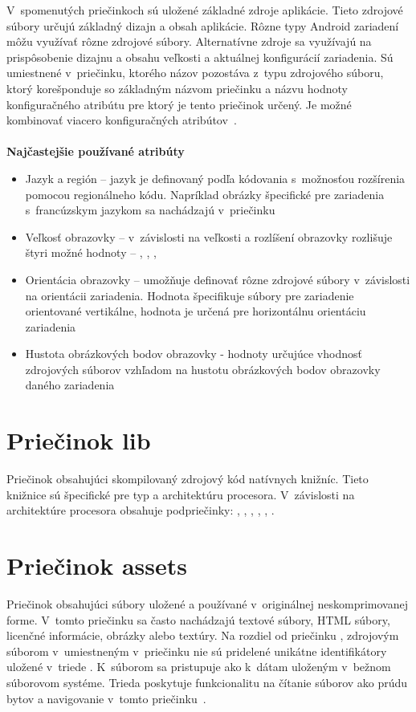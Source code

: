 \noindent V~spomenutých priečinkoch sú uložené základné zdroje aplikácie. Tieto zdrojové súbory určujú základný dizajn a obsah aplikácie. Rôzne typy Android zariadení môžu využívať rôzne zdrojové súbory. Alternatívne zdroje sa využívajú na prispôsobenie dizajnu a obsahu veľkosti a aktuálnej konfigurácií zariadenia. Sú umiestnené v~priečinku, ktorého názov pozostáva z~typu zdrojového súboru, ktorý korešponduje so základným názvom priečinku a názvu hodnoty konfiguračného atribútu pre ktorý je tento priečinok určený. Je možné kombinovať viacero konfiguračných atribútov~\cite{providingAltRes}.\\\\
\textbf{Najčastejšie používané atribúty}
\begin{itemize}
\item Jazyk a región – jazyk je definovaný podľa kódovania  s~možnosťou rozšírenia pomocou  regionálneho kódu. Napríklad obrázky špecifické pre zariadenia s~francúzskym jazykom sa nachádzajú v~priečinku 
\item Veľkosť obrazovky –  v~závislosti na veľkosti a rozlíšení obrazovky rozlišuje štyri možné hodnoty -- , , , 
\item Orientácia obrazovky – umožňuje definovať rôzne zdrojové súbory v~závislosti na orientácii zariadenia. Hodnota  špecifikuje súbory pre zariadenie orientované vertikálne, hodnota  je určená pre horizontálnu orientáciu zariadenia	
\item Hustota obrázkových bodov obrazovky -  hodnoty určujúce vhodnosť zdrojových súborov vzhľadom na hustotu obrázkových bodov obrazovky daného zariadenia
\end{itemize}


\section{Priečinok lib}
\label{lib}
Priečinok obsahujúci skompilovaný zdrojový kód natívnych knižníc. Tieto knižnice sú špecifické pre typ a architektúru procesora. V~závislosti na architektúre procesora obsahuje podpriečinky: , , , , , .

\section{Priečinok assets}
\label{assets}
Priečinok obsahujúci súbory uložené a používané v~originálnej neskomprimovanej forme. V~tomto priečinku sa často nachádzajú textové súbory, HTML súbory, licenčné informácie, obrázky alebo textúry. Na rozdiel od priečinku , zdrojovým súborom v~umiestneným v~priečinku  nie sú pridelené unikátne identifikátory uložené v~triede . K~súborom sa pristupuje ako k~dátam uloženým v~bežnom súborovom systéme. Trieda  poskytuje funkcionalitu na čítanie súborov ako prúdu bytov a  navigovanie v~tomto priečinku~\cite{AssetManager}.

